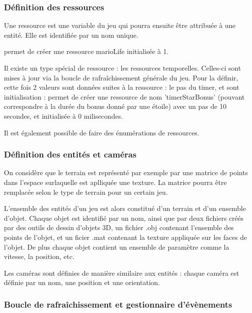 \subsubsection{Définition des ressources}

Une ressource est une variable du jeu qui pourra ensuite être attribuée à une entité.
Elle est identifiée par un nom unique.

 permet de créer une ressource marioLife initialisée à 1.

Il existe un type spécial de ressource : les ressources temporelles.
Celles-ci sont mises à jour via la boucle de rafraîchissement générale du jeu.
Pour la définir, cette fois 2 valeurs sont données suites à la ressource : le pas du timer, et sont initialisation :
 permet de créer une ressource de nom 'timerStarBonus' (pouvant correspondre à la durée du bonus donné par une étoile)
avec un pas de 10 secondes, et initialisée à 0 milisecondes. 

Il est également possible de faire des énumérations de ressources.

\subsubsection{Définition des entités et caméras}

On considère que le terrain est représenté par exemple par une matrice de points dans l'espace surlaquelle est aplliquée une texture.
La matrice pourra être remplacée selon le type de terrain pour un certain jeu. 

L'ensemble des entités d'un jeu est alors constitué d'un terrain et d'un ensemble d'objet.
Chaque objet est identifié par un nom, ainsi que par deux fichiers créés par des outils de dessin d'objets 3D, un fichier .obj contenant l'ensemble
des points de l'objet, et un ficier .mat contenant la texture appliquée sur les faces de l'objet.
De plus chaque objet contient un ensemble de paramètre comme la vitesse, la position, etc. 

Les caméras sont définies de manière similaire aux entités : chaque caméra est définie par un nom, une position et une orientation.


\subsubsection{Boucle de rafraîchissement et gestionnaire d'évènements}

